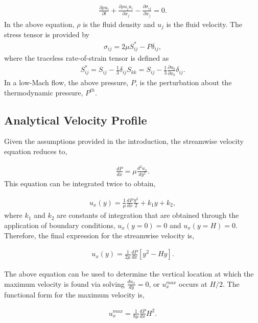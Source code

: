 \documentclass{article}
\begin{document}
\begin{align}
  \frac {\partial \rho u_i }{\partial t} + \frac{ \partial \rho u_j u_i}{\partial x_j} 
-\frac{\partial \sigma_{ij}}{\partial x_j} = 0.
\label{eq:momEq}
\end{align}
%
In the above equation, $\rho$ is the fluid density and $u_j$ is the fluid velocity. 
The stress tensor is provided by
\begin{align}
\sigma_{ij}  = 2 \mu S^*_{ij} - P \delta_{ij},
\end{align}
%
where the traceless rate-of-strain tensor is defined as
\begin{align}
S^*_{ij}  = S_{ij} - \frac{1}{3} \delta_{ij} S_{kk} \nonumber
		     = S_{ij} - \frac{1}{3} \frac{\partial  u_k }{\partial x_k}\delta_{ij}.
\end{align}
In a low-Mach flow, the above pressure, $P$, is the perturbation about the thermodynamic
pressure, $P^{th}$. 

\subsection{Analytical Velocity Profile}
Given the assumptions provided in the introduction, the streamwise velocity equation reduces to,

\begin{align}
  \frac{d P}{dx} = \mu \frac{d^2 u_x}{dy^2}.
\label{eq:simpEq}
\end{align}
This equation can be integrated twice to obtain,

\begin{align}
  u_x(y) = \frac{1}{\mu}\frac{d P}{dx} \frac{y^2}{2} + k_1 y + k_2,
\label{eq:simpEqWithK}
\end{align}
where $k_1$ and $k_2$ are constants of integration that are obtained through the 
application of boundary conditions, $u_x(y=0) = 0$ and  $u_x(y=H) = 0$. Therefore,
the final expression for the streamwise velocity is,

\begin{align}
  u_x(y) = \frac{1}{2 \mu}\frac{d P}{dx}\left[ y^2 - Hy \right].
\label{eq:simpleEqWithoutK}
\end{align}

The above equation can be used to determine the vertical location at which 
the maximum velocity is found via solving $\frac{du_x}{dy} = 0$, or $u^{max}_x$ 
occurs at $H/2$. The functional form for the maximum velocity is,

\begin{align}
  u^{max}_x = \frac{1}{8 \mu}\frac{d P}{dx}H^2.
\label{eq:uMax}
\end{align}
\end{document}
